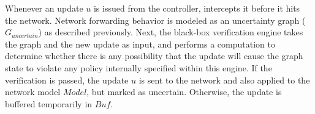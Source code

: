 Whenever an update $u$ is issued from the controller, 
\name intercepts it before it hits the network.
Network forwarding behavior is modeled as 
an uncertainty graph ($G_{uncertain}$) as described previously.
Next, the black-box verification engine takes the graph and the new update as input,
and performs a computation to determine whether there is any possibility that the
update will cause the graph state to violate
any policy internally specified within this engine.
If the verification is passed, the update $u$ is sent to the network
and also applied to the network model $Model$, but marked as uncertain.
Otherwise, the update is buffered temporarily in $Buf$.

% 
% 


